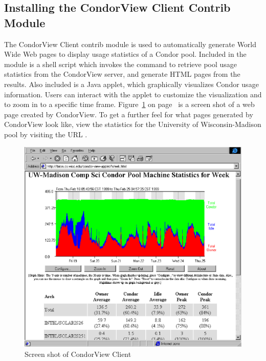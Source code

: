 \subsection{\label{sec:CondorView-Client-Install}
Installing the CondorView Client Contrib Module} 

The CondorView Client contrib module is used to automatically generate
World Wide Web pages to display usage statistics of a Condor
pool.
Included in the module is a shell script which invokes the 
command to retrieve pool usage statistics from the CondorView server, and
generate HTML pages from the results.  
Also included is a Java applet, which graphically visualizes Condor 
usage information.  
Users can interact with the applet to customize the visualization and to
zoom in to a specific time frame.
Figure~\ref{fig:view-screenshot} on page~\pageref{fig:view-screenshot}
is a screen shot of a web page created by CondorView.  
To get a further feel for what pages generated by CondorView look like,
view the statistics for the University of Wisconsin-Madison pool 
by visiting the URL 
.

\begin{figure}[hbt]
\centering
\includegraphics{admin-man/view-screenshot.ps}
\caption{\label{fig:view-screenshot}Screen shot of CondorView Client}
\end{figure}


